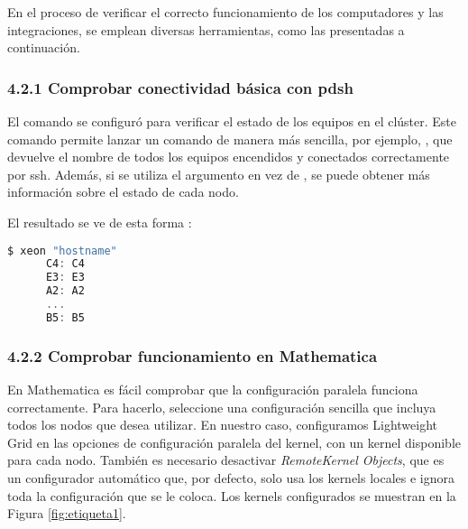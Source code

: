 \begin{spacing}{1.5}
  En el proceso de verificar el correcto funcionamiento de los computadores y las integraciones, se emplean diversas herramientas, como las presentadas a continuación.

  \subsubsection {4.2.1 Comprobar conectividad básica con pdsh}

  El comando  se configuró para verificar el estado de los equipos
  en
  el clúster. Este comando permite lanzar un comando de manera más sencilla,
  por
  ejemplo, , que devuelve el nombre de
  todos los
  equipos encendidos y conectados correctamente por ssh. Además, si se utiliza
  el
  argumento  en vez de , se puede obtener más
  información sobre el estado de cada nodo.

  El resultado se ve de esta forma :


  \begin{lstlisting}[language=C]
      $ xeon "hostname"
      C4: C4
      E3: E3
      A2: A2
      ...
      B5: B5
  \end{lstlisting}

  \subsubsection {4.2.2 Comprobar funcionamiento en Mathematica}

  En Mathematica es fácil comprobar que la configuración paralela funciona
  correctamente. Para hacerlo, seleccione una configuración sencilla que
  incluya
  todos los nodos que desea utilizar. En nuestro caso, configuramos Lightweight
  Grid en las opciones de configuración paralela del kernel, con un kernel
  disponible para cada nodo. También es necesario desactivar
  \textit{RemoteKernel
    Objects}, que es un configurador automático que, por defecto, solo usa los
  kernels locales e ignora toda la configuración que se le coloca. Los kernels
  configurados se muestran en la Figura \ref{fig:etiqueta1}.  \newline  \newline


\end{spacing}
